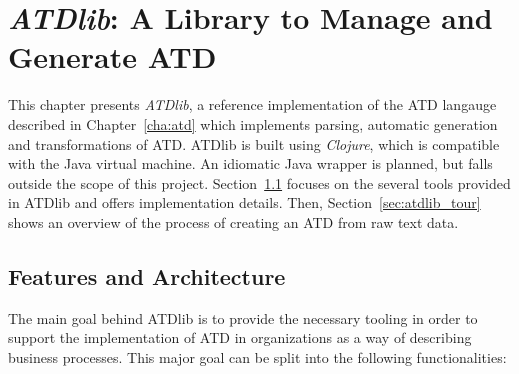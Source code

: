 \chapter{\emph{ATDlib}: A Library to Manage and Generate ATD}
\label{cha:atdlib}

This chapter presents \emph{ATDlib}, a reference implementation of the ATD
langauge described in Chapter~\ref{cha:atd} which implements parsing, automatic
generation and transformations of ATD. ATDlib is built using
\emph{Clojure}\cite{Hickey:2008:CPL:1408681.1408682}, which is compatible with
the Java virtual machine. An idiomatic Java wrapper is planned, but falls
outside the scope of this project. Section~\ref{sec:architecture} focuses on the
several tools provided in ATDlib and offers implementation details. Then,
Section~\ref{sec:atdlib_tour} shows an overview of the process of creating an
ATD from raw text data.

\section{Features and Architecture}
\label{sec:architecture}

The main goal behind ATDlib is to provide the necessary tooling in order to
support the implementation of ATD in organizations as a way of describing
business processes. This major goal can be split into the following
functionalities:


